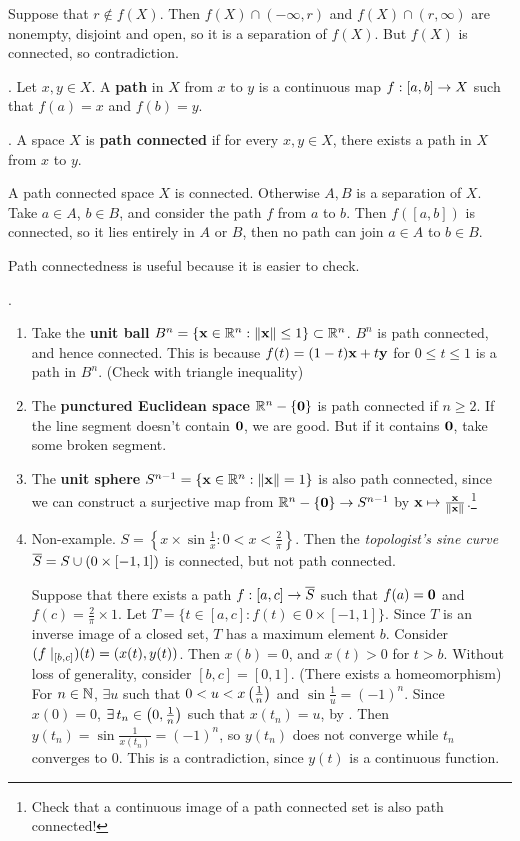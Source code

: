 \pf Suppose that \(r \notin f(X)\). Then \(f(X) \cap (-\infty, r)\) and \(f(X) \cap (r, \infty)\) are nonempty, disjoint and open, so it is a separation of \(f(X)\). But \(f(X)\) is connected, so contradiction.

.  Let \(x, y \in X\). A \textbf{path} in \(X\) from \(x\) to \(y\) is a continuous map \(f : [a, b] \ra X\) such that \(f(a) = x\) and \(f(b) = y\).

.  A space \(X\) is \textbf{path connected} if for every \(x, y \in X\), there exists a path in \(X\) from \(x\) to \(y\).

\rmk A path connected space \(X\) is connected. Otherwise \(A, B\) is a separation of \(X\). Take \(a \in A\), \(b \in B\), and consider the path \(f\) from \(a\) to \(b\). Then \(f([a, b])\) is connected, so it lies entirely in \(A\) or \(B\), then no path can join \(a \in A\) to \(b \in B\).

Path connectedness is useful because it is easier to check.

\ex.
\begin{enumerate}
    \item Take the \textbf{unit ball} \(B^n = \{\bf{x} \in \R^n : \norm{\bf{x}} \leq 1\} \subset \R^n\). \(B^n\) is path connected, and hence connected. This is because \(f(t) = (1-t)\bf{x} + t\bf{y}\) for \(0\leq t \leq 1\) is a path in \(B^n\). (Check with triangle inequality)
    \item The \textbf{punctured Euclidean space} \(\R^n \bs \{\bf{0}\}\) is path connected if \(n \geq 2\). If the line segment doesn't contain \(\bf{0}\), we are good. But if it contains \(\bf{0}\), take some broken segment.
    \item The \textbf{unit sphere} \(S^{n-1} = \{\bf{x} \in \R^n : \norm{\bf{x}} = 1\}\) is also path connected, since we can construct a surjective map from \(\R^n \bs \{\bf{0}\} \ra S^{n-1}\) by \(\bf{x} \mapsto \frac{\bf{x}}{\norm{\bf{x}}}\).\footnote{Check that a continuous image of a path connected set is also path connected!}
    \item Non-example. \(S = \left\{x \times \sin \frac{1}{x} : 0 < x < \frac{2}{\pi}\right\}\).
          Then the \textit{topologist's sine curve} \(\cl{S} = S \cup \paren{0 \times [-1, 1]}\) is connected, but not path connected.

          \pf Suppose that there exists a path \(f : [a, c] \ra \cl{S}\) such that \(f(a) = \bf{0}\) and \(f(c) = \frac{2}{\pi} \times 1\). Let \(T = \{t \in [a, c] : f(t) \in 0\times [-1, 1]\}\). Since \(T\) is an inverse image of a closed set, \(T\) has a maximum element \(b\). Consider \((f \mid_{[b, c]})(t) = \paren{x(t), y(t)}\). Then \(x(b) = 0\), and \(x(t) > 0\) for \(t > b\). Without loss of generality, consider \([b, c] = [0, 1]\). (There exists a homeomorphism) For \(n \in \N\), \(\exists u\) such that \(0 < u < x\paren{\frac{1}{n}}\) and \(\sin \frac{1}{u} = (-1)^n\). Since \(x(0) = 0\), \(\exists t_n \in \paren{0, \frac{1}{n}}\) such that \(x(t_n) = u\), by . Then \(y(t_n) = \sin \frac{1}{x(t_n)} = (-1)^n\), so \(y(t_n)\) does not converge while \(t_n\) converges to \(0\). This is a contradiction, since \(y(t)\) is a continuous function.
\end{enumerate}

